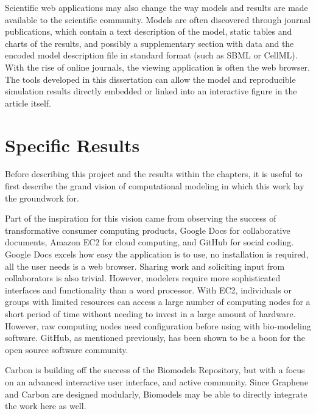 Scientific web applications may also change the way models and results are made available to the scientific community.
Models are often discovered through journal publications, which contain a text description of the model, static tables and charts of the results, and possibly a supplementary section with data and the encoded model description file in standard format (such as SBML or CellML).
With the rise of online journals, the viewing application is often the web browser.
The tools developed in this dissertation can allow the model and reproducible simulation results directly embedded or linked into an interactive figure in the article itself.

\section{Specific Results}

Before describing this project and the results within the chapters, it is useful to first describe the grand vision of computational modeling in which this work lay the groundwork for.

Part of the inspiration for this vision came from observing the success of transformative consumer computing products, Google Docs for collaborative documents, Amazon EC2 for cloud computing, and GitHub for social coding.
Google Docs excels how easy the application is to use, no installation is required, all the user needs is a web browser.
Sharing work and soliciting input from collaborators is also trivial.
However, modelers require more sophisticated interfaces and functionality than a word processor.
With EC2, individuals or groups with limited resources can access a large number of computing nodes for a short period of time without needing to invest in a large amount of hardware.
However, raw computing nodes need configuration before using with bio-modeling software.
GitHub, as mentioned previously, has been shown to be a boon for the open source software community.

Carbon is building off the success of the Biomodels Repository, but with a focus on an advanced interactive user interface, and active community.
Since Graphene and Carbon are designed modularly, Biomodels may be able to directly integrate the work here as well.

